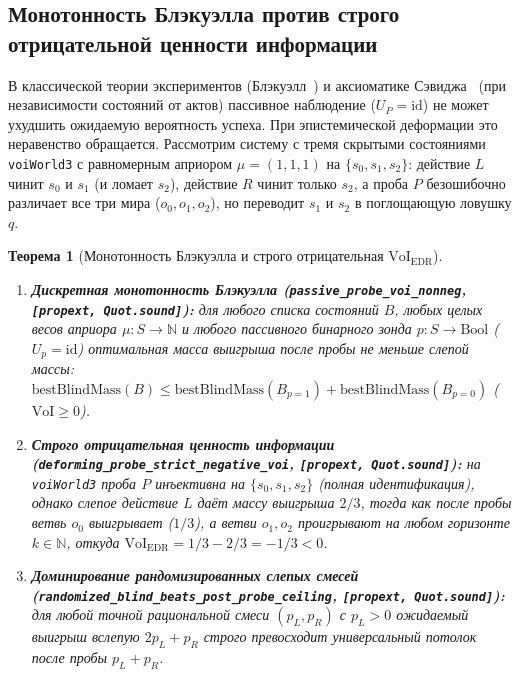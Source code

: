 \documentclass[10pt,a4paper]{article}
\theoremstyle{cleanthm}
\newtheorem{theorem}{Теорема}[section]
\theoremstyle{cleandef}
\begin{document}
\subsection{Монотонность Блэкуэлла против строго отрицательной ценности информации}

В классической теории экспериментов (Блэкуэлл~\cite{blackwell1953}) и аксиоматике Сэвиджа~\cite{savage1954} (при независимости состояний от актов) пассивное наблюдение ($U_P=\mathrm{id}$) не может ухудшить ожидаемую вероятность успеха. При эпистемической деформации это неравенство обращается. Рассмотрим систему с тремя скрытыми состояниями \texttt{voiWorld3} с равномерным априором $\mu=(1,1,1)$ на $\{s_0,s_1,s_2\}$: действие $L$ чинит $s_0$ и $s_1$ (и ломает $s_2$), действие $R$ чинит только $s_2$, а проба $P$ безошибочно различает все три мира ($o_0,o_1,o_2$), но переводит $s_1$ и $s_2$ в поглощающую ловушку $q$.

\begin{theorem}[Монотонность Блэкуэлла и строго отрицательная $\mathrm{VoI}_{\mathrm{EDR}}$]
\label{thm:voi}
\begin{enumerate}
  \item \textbf{Дискретная монотонность Блэкуэлла (\texttt{passive\_\allowbreak probe\_\allowbreak voi\_\allowbreak nonneg}, \texttt{[propext, Quot.sound]}):} для любого списка состояний $B$, любых целых весов априора $\mu:S\to\mathbb{N}$ и любого пассивного бинарного зонда $p:S\to\mathrm{Bool}$ ($U_p=\mathrm{id}$) оптимальная масса выигрыша после пробы не меньше слепой массы: $\mathrm{bestBlindMass}(B)\le\mathrm{bestBlindMass}(B_{p=1})+\mathrm{bestBlindMass}(B_{p=0})$ ($\mathrm{VoI}\ge 0$).
  \item \textbf{Строго отрицательная ценность информации (\texttt{deforming\_\allowbreak probe\_\allowbreak strict\_\allowbreak negative\_\allowbreak voi}, \texttt{[propext, Quot.sound]}):} на \texttt{voiWorld3} проба $P$ инъективна на $\{s_0,s_1,s_2\}$ (полная идентификация), однако слепое действие $L$ даёт массу выигрыша $2/3$, тогда как после пробы ветвь $o_0$ выигрывает ($1/3$), а ветви $o_1,o_2$ проигрывают на \emph{любом} горизонте $k\in\mathbb{N}$, откуда $\mathrm{VoI}_{\mathrm{EDR}}=1/3-2/3=-1/3<0$.
  \item \textbf{Доминирование рандомизированных слепых смесей (\texttt{randomized\_\allowbreak blind\_\allowbreak beats\_\allowbreak post\_\allowbreak probe\_\allowbreak ceiling}, \texttt{[propext, Quot.sound]}):} для любой точной рациональной смеси $(p_L,p_R)$ с $p_L>0$ ожидаемый выигрыш вслепую $2p_L+p_R$ строго превосходит универсальный потолок после пробы $p_L+p_R$.
\end{enumerate}
\end{theorem}
\end{document}
